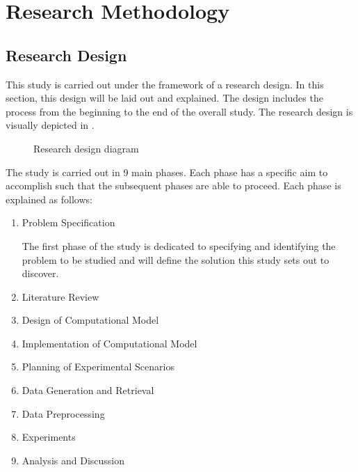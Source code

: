 \chapter{Research Methodology}\label{sec:research_methodology}


\section{Research Design}
\noindent This study is carried out under the framework of a research design. In this section, this design will be laid out and explained. The design includes the process from the beginning to the end of the overall study. The research design is visually depicted in .

\begin{figure}[h]
  \centering
  \caption{Research design diagram}\label{fig:research_design_diagram}
\end{figure}

The study is carried out in 9 main phases. Each phase has a specific aim to accomplish such that the subsequent phases are able to proceed. Each phase is explained as follows:

\begin{enumerate}
  \item Problem Specification

        The first phase of the study is dedicated to specifying and identifying the problem to be studied and will define the solution this study sets out to discover.

  \item Literature Review



  \item Design of Computational Model



  \item Implementation of Computational Model



  \item Planning of Experimental Scenarios



  \item Data Generation and Retrieval



  \item Data Preprocessing



  \item Experiments



  \item Analysis and Discussion


\end{enumerate}

